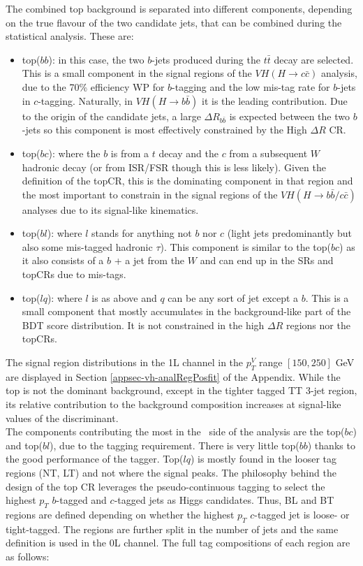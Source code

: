 The combined top background is separated into different components, depending on the true flavour of the two candidate jets, that can be combined during the statistical analysis. These are:
\begin{itemize}
\item top($bb$): in this case, the two $b$-jets produced during the $t\bar{t}$ decay are selected. This is a small component in the signal regions of the $VH(H\rightarrow c\bar{c})$ analysis, due to the 70\% efficiency WP for $b$-tagging and the low mis-tag rate for $b$-jets in $c$-tagging. Naturally, in $VH(H\rightarrow b\bar{b})$ it is the leading contribution. Due to the origin of the candidate jets, a large $\Delta R_{b\bar{b}}$ is expected between the two $b$-jets so this component is most effectively constrained by the High $\Delta R$ CR. 
\item top($bc$): where the $b$ is from a $t$ decay and the $c$ from a subsequent $W$ hadronic decay (or from ISR/FSR though this is less likely). Given the definition of the topCR, this is the dominating component in that region and the most important to constrain in the signal regions of the $VH(H\rightarrow b\bar{b}/c\bar{c})$ analyses due to its signal-like kinematics. 
\item top($bl$): where $l$ stands for anything not $b$ nor $c$ (light jets predominantly but also some mis-tagged hadronic $\tau$). This component is similar to the top($bc$) as it also consists of a $b$ + a jet from the $W$ and can end up in the SRs and topCRs due to mis-tags.
\item top($lq$): where $l$ is as above and $q$ can be any sort of jet except a $b$. This is a small component that mostly accumulates in the background-like part of the BDT score distribution. It is not constrained in the high $\Delta R$ regions nor the topCRs.
\end{itemize}
The signal region distributions in the 1L channel in the $p_T^V$ range $[150, 250]$ GeV are displayed in Section \ref{appsec-vh-analRegPosfit} of the Appendix. While the top is not the dominant background, except in the tighter tagged TT 3-jet region, its relative contribution to the background composition increases at signal-like values of the discriminant. \\

The components contributing the most in the \vhc\ side of the analysis are the top($bc$) and top($bl$), due to the tagging requirement. There is very little top($bb$) thanks to the good performance of the tagger. Top($lq$) is mostly found in the looser tag regions (NT, LT) and not where the signal peaks. The philosophy behind the design of the top CR leverages the pseudo-continuous tagging to select the highest $p_T$ $b$-tagged and $c$-tagged jets as Higgs candidates. Thus, BL and BT regions are defined depending on whether the highest $p_T$ $c$-tagged jet is loose- or tight-tagged. The regions are further split in the number of jets and the same definition is used in the 0L channel. The full tag compositions of each region are as follows:

